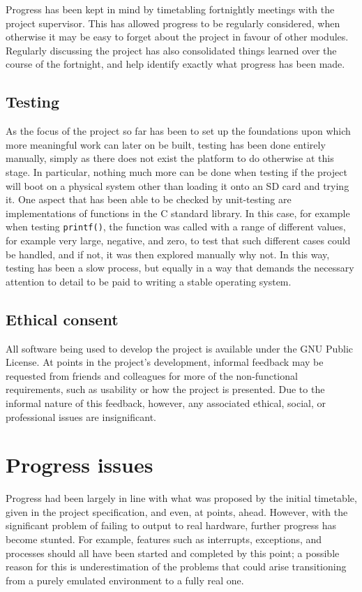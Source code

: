 \documentclass[10pt,a4paper]{article}
\newcommand{\code}[1]{\texttt{#1}}
\begin{document}
Progress has been kept in mind by timetabling fortnightly meetings with the
project supervisor. This has allowed progress to be regularly considered, when
otherwise it may be easy to forget about the project in favour of other modules.
Regularly discussing the project has also consolidated things learned over the
course of the fortnight, and help identify exactly what progress has been made.

\subsection*{Testing}
As the focus of the project so far has been to set up the foundations upon which
more meaningful work can later on be built, testing has been done entirely
manually, simply as there does not exist the platform to do otherwise at this
stage. In particular, nothing much more can be done when testing if the project
will boot on a physical system other than loading it onto an SD card and
trying it. One aspect that has been able to be checked by unit-testing are
implementations of functions in the C standard library. In this case, for
example when testing \code{printf()}, the function was called with a range of
different values, for example very large, negative, and zero, to test that such
different cases could be handled, and if not, it was then explored manually why
not. In this way, testing has been a slow process, but equally in a way that
demands the necessary attention to detail to be paid to writing a stable
operating system.

\subsection*{Ethical consent}
All software being used to develop the project is available under the GNU Public
License. At points in the project's development, informal feedback may be
requested from friends and colleagues for more of the non-functional
requirements, such as usability or how the project is presented. Due to the
informal nature of this feedback, however, any associated ethical, social, or
professional issues are insignificant.

\section*{Progress issues}
Progress had been largely in line with what was proposed by the initial
timetable, given in the project specification, and even, at points, ahead.
However, with the significant problem of failing to output to real hardware,
further progress has become stunted. For example, features such as interrupts,
exceptions, and processes should all have been started and completed by this
point; a possible reason for this is underestimation of the problems that could
arise transitioning from a purely emulated environment to a fully real one.
\end{document}
